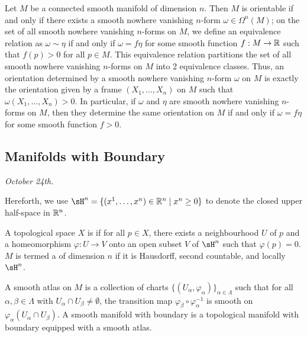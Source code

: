 Let $M$ be a connected smooth manifold of dimension $n$. Then $M$ is orientable if and only if there exists a smooth nowhere vanishing $n$-form $\omega \in \Omega^{n}(M)$; on the set of all smooth nowhere vanishing $n$-forms on $M$, we define an equivalence relation as $\omega \sim \eta$ if and only if $\omega = f\eta$ for some smooth function $f:M \to \mathbb{R}$ such that $f(p) > 0$ for all $p \in M$. This equivalence relation partitions the set of all smooth nowhere vanishing $n$-forms on $M$ into 2 equivalence classes. Thus, an orientation determined by a smooth nowhere vanishing $n$-form $\omega$ on $M$ is exactly the orientation given by a frame $(X_{1},\ldots,X_{n})$ on $M$ such that $\omega(X_{1},\ldots,X_{n}) > 0$. In particular, if $\omega$ and $\eta$ are smooth nowhere vanishing $n$-forms on $M$, then they determine the same orientation on $M$ if and only if $\omega = f\eta$ for some smooth function $f > 0$.

\subsection{Manifolds with Boundary}
\textit{October 24th.}

Hereforth, we use $\sH^{n} = \{(x^{1},\ldots,x^{n}) \in \R^{n} \mid x^{n} \geq 0\}$ to denote the closed upper half-space in $\mathbb{R}^{n}$.

\begin{definition}
    A topological space $X$ is  if for all $p \in X$, there exists a neighbourhood $U$ of $p$ and a homeomorphism $\varphi:U \to V$ onto an open subset $V$ of $\sH^{n}$ such that $\varphi(p) = 0$. $M$ is termed a  of dimension $n$ if it is Hausdorff, second countable, and locally $\sH^{n}$.
\end{definition}

A smooth atlas on $M$ is a collection of charts $\{(U_{\alpha},\varphi_{\alpha})\}_{\alpha \in \Lambda}$ such that for all $\alpha,\beta \in \Lambda$ with $U_{\alpha} \cap U_{\beta} \neq \emptyset$, the transition map $\varphi_{\beta} \circ \varphi_{\alpha}^{-1}$ is smooth on $\varphi_{\alpha}(U_{\alpha} \cap U_{\beta})$. A smooth manifold with boundary is a topological manifold with boundary equipped with a smooth atlas. 

